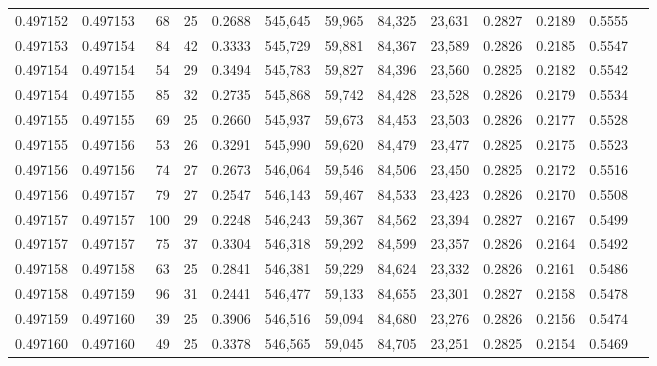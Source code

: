 \begin{tabular}{rrrrrrrrrrrrr}
0.497152 & 0.497153 &  68 &  25 &                                     0.2688 & 545,645 &  59,965 &  84,325 &  23,631 & 0.2827 & 0.2189 & 0.5555 \\
0.497153 & 0.497154 &  84 &  42 &                                     0.3333 & 545,729 &  59,881 &  84,367 &  23,589 & 0.2826 & 0.2185 & 0.5547 \\
0.497154 & 0.497154 &  54 &  29 &                                     0.3494 & 545,783 &  59,827 &  84,396 &  23,560 & 0.2825 & 0.2182 & 0.5542 \\
0.497154 & 0.497155 &  85 &  32 &                                     0.2735 & 545,868 &  59,742 &  84,428 &  23,528 & 0.2826 & 0.2179 & 0.5534 \\
0.497155 & 0.497155 &  69 &  25 &                                     0.2660 & 545,937 &  59,673 &  84,453 &  23,503 & 0.2826 & 0.2177 & 0.5528 \\
0.497155 & 0.497156 &  53 &  26 &                                     0.3291 & 545,990 &  59,620 &  84,479 &  23,477 & 0.2825 & 0.2175 & 0.5523 \\
0.497156 & 0.497156 &  74 &  27 &                                     0.2673 & 546,064 &  59,546 &  84,506 &  23,450 & 0.2825 & 0.2172 & 0.5516 \\
0.497156 & 0.497157 &  79 &  27 &                                     0.2547 & 546,143 &  59,467 &  84,533 &  23,423 & 0.2826 & 0.2170 & 0.5508 \\
0.497157 & 0.497157 & 100 &  29 &                                     0.2248 & 546,243 &  59,367 &  84,562 &  23,394 & 0.2827 & 0.2167 & 0.5499 \\
0.497157 & 0.497157 &  75 &  37 &                                     0.3304 & 546,318 &  59,292 &  84,599 &  23,357 & 0.2826 & 0.2164 & 0.5492 \\
0.497158 & 0.497158 &  63 &  25 &                                     0.2841 & 546,381 &  59,229 &  84,624 &  23,332 & 0.2826 & 0.2161 & 0.5486 \\
0.497158 & 0.497159 &  96 &  31 &                                     0.2441 & 546,477 &  59,133 &  84,655 &  23,301 & 0.2827 & 0.2158 & 0.5478 \\
0.497159 & 0.497160 &  39 &  25 &                                     0.3906 & 546,516 &  59,094 &  84,680 &  23,276 & 0.2826 & 0.2156 & 0.5474 \\
0.497160 & 0.497160 &  49 &  25 &                                     0.3378 & 546,565 &  59,045 &  84,705 &  23,251 & 0.2825 & 0.2154 & 0.5469 \\

\end{tabular}

